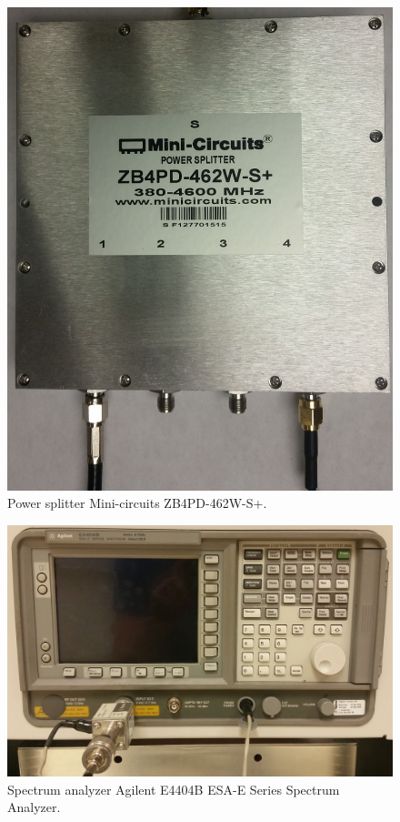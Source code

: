 \begin{figure}
	\centering\includegraphics[scale=0.5]{figures/eq_GPUimplementation/splitter.jpg}
	\caption{Power splitter Mini-circuits ZB4PD-462W-S+.}
	\label{fig:splitter}
\end{figure}
\begin{figure}
	\centering\includegraphics[scale=0.5]{figures/eq_GPUimplementation/specAn.jpg}
	\caption{Spectrum analyzer Agilent E4404B ESA-E Series Spectrum Analyzer.}
	\label{fig:specAn}
\end{figure}
